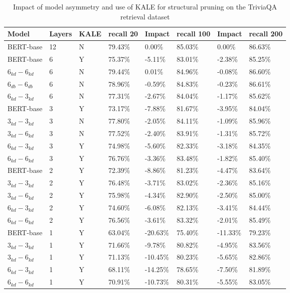 \begin{table*}[!ht]
    \centering
    \begin{tabular}{|l|l|l|l|l|l|l|l|}
    \hline
        Model & Layers & KALE & recall 20 & Impact & recall 100 & Impact & recall 200 \\ \hline
        BERT-base & 12 & N & 79.43\% & 0.00\% & 85.03\% & 0.00\% & 86.63\% \\ \hline
        BERT-base & 6 & Y & 75.37\% & -5.11\% & 83.01\% & -2.38\% & 85.25\% \\ \hline
        $6_{kd}-6_{kd}$ & 6 & N & 79.44\% & 0.01\% & 84.96\% & -0.08\% & 86.60\% \\ \hline
        $6_{db}-6_{db}$ & 6 & N & 78.96\% & -0.59\% & 84.83\% & -0.23\% & 86.61\% \\ \hline
        $6_{kd}-3_{kd}$ & 6 & N & 77.31\% & -2.67\% & 84.04\% & -1.17\% & 85.62\% \\ \hline
        BERT-base & 3 & Y & 73.17\% & -7.88\% & 81.67\% & -3.95\% & 84.04\% \\ \hline
        $3_{kd}-3_{kd}$ & 3 & N & 77.80\% & -2.05\% & 84.11\% & -1.09\% & 85.96\% \\ \hline
        $3_{kd}-6_{kd}$ & 3 & N & 77.52\% & -2.40\% & 83.91\% & -1.31\% & 85.72\% \\ \hline
        $6_{kd}-3_{kd}$ & 3 & Y & 74.98\% & -5.60\% & 82.33\% & -3.18\% & 84.35\% \\ \hline
        $6_{kd}-6_{kd}$ & 3 & Y & 76.76\% & -3.36\% & 83.48\% & -1.82\% & 85.40\% \\ \hline
        BERT-base & 2 & Y & 72.39\% & -8.86\% & 81.23\% & -4.47\% & 83.64\% \\ \hline
        $3_{kd}-3_{kd}$ & 2 & Y & 76.48\% & -3.71\% & 83.02\% & -2.36\% & 85.16\% \\ \hline
        $3_{kd}-6_{kd}$ & 2 & Y & 75.98\% & -4.34\% & 82.90\% & -2.50\% & 85.00\% \\ \hline
        $6_{kd}-3_{kd}$ & 2 & Y & 74.60\% & -6.08\% & 82.13\% & -3.41\% & 84.44\% \\ \hline
        $6_{kd}-6_{kd}$ & 2 & Y & 76.56\% & -3.61\% & 83.32\% & -2.01\% & 85.49\% \\ \hline
        BERT-base & 1 & Y & 63.04\% & -20.63\% & 75.40\% & -11.33\% & 79.23\% \\ \hline
        $3_{kd}-3_{kd}$ & 1 & Y & 71.66\% & -9.78\% & 80.82\% & -4.95\% & 83.56\% \\ \hline
        $3_{kd}-6_{kd}$ & 1 & Y & 71.13\% & -10.45\% & 80.23\% & -5.65\% & 82.86\% \\ \hline
        $6_{kd}-3_{kd}$ & 1 & Y & 68.11\% & -14.25\% & 78.65\% & -7.50\% & 81.89\% \\ \hline
        $6_{kd}-6_{kd}$ & 1 & Y & 70.91\% & -10.73\% & 80.31\% & -5.55\% & 83.05\% \\ \hline
    \end{tabular}
    \caption{Impact of model asymmetry and use of KALE for structural pruning on the TriviaQA retrieval dataset}
    \label{tab:kale+asym-trivia}
\end{table*}

